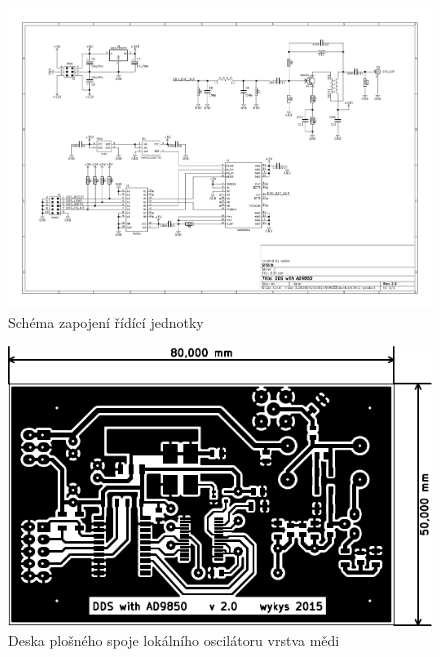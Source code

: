 \begin{landscape}
	\begin{figure}[h]
		\centering 	
		\includegraphics[height=\textwidth]{img/lo/sch.pdf}
		\caption{Schéma zapojení řídící jednotky}	
	\end{figure}
\end{landscape}
%

\begin{figure}[H]
	\centering
	\includegraphics[width=170mm]{img/lo/cu_b.pdf}
	\caption{Deska plošného spoje lokálního oscilátoru vrstva mědi}    		
\end{figure}

